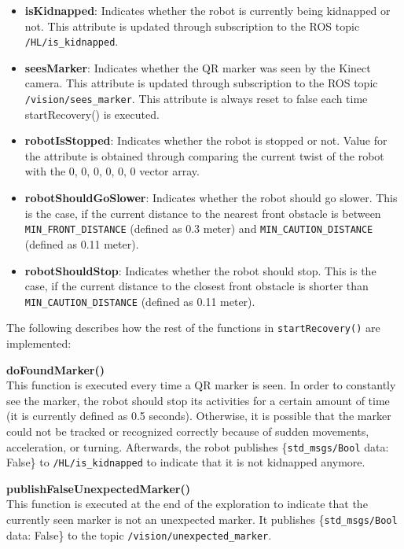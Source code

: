\begin{itemize}
\item \textbf{isKidnapped}:
Indicates whether the robot is currently being kidnapped or not. This attribute is updated through subscription to the ROS topic \texttt{/HL/is\_kidnapped}.

\item \textbf{seesMarker}:
Indicates whether the QR marker was seen by the Kinect camera. This attribute is updated through subscription to the ROS topic \texttt{/vision/sees\_marker}. This attribute is always reset to false each time startRecovery() is executed.

\item \textbf{robotIsStopped}:
Indicates whether the robot is stopped or not. Value for the attribute is obtained through comparing the current twist of the robot with the {0, 0, 0, 0, 0, 0} vector array.

\item \textbf{robotShouldGoSlower}:
 Indicates whether the robot should go slower. This is the case, if the current distance to the nearest front obstacle is between \texttt{MIN\_FRONT\_DISTANCE} (defined as 0.3 meter) and \texttt{MIN\_CAUTION\_DISTANCE} (defined as 0.11 meter).

\item \textbf{robotShouldStop}:
Indicates whether the robot should stop. This is the case, if the current distance to the closest front obstacle is shorter than \texttt{MIN\_CAUTION\_DISTANCE}  (defined as 0.11 meter).
\end{itemize}


The following describes how the rest of the functions in \texttt{startRecovery()} are implemented:
\begin{description}

\item \textbf{doFoundMarker()} \hfill \\
This function is executed every time a QR marker is seen. In order to constantly see the marker, the robot should stop its activities for a certain amount of time (it is currently defined as 0.5 seconds). Otherwise, it is possible that the marker could not be tracked or recognized correctly because of sudden movements, acceleration, or turning. Afterwards, the robot publishes \{\texttt{std\_msgs/Bool} data: False\} to \texttt{/HL/is\_kidnapped} to indicate that it is not kidnapped anymore.

\item \textbf{publishFalseUnexpectedMarker()} \hfill \\
This function is executed at the end of the exploration to indicate that the currently seen marker is not an unexpected marker. It publishes \{\texttt{std\_msgs/Bool} data: False\} to the topic \texttt{/vision/unexpected\_marker}.

\end{description}

